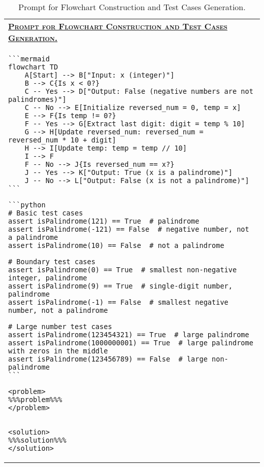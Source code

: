 \begin{table*}[htbp]
\centering
\captionsetup{justification=centering}
\begin{tabular}{p{\textwidth}}
\toprule
\underline{\textbf{\textsc{Prompt for Flowchart Construction and Test Cases Generation.}}} \\
\begin{minipage}{\textwidth}
\vspace{2mm}
\begin{verbatim}
```mermaid
flowchart TD
    A[Start] --> B["Input: x (integer)"]
    B --> C{Is x < 0?}
    C -- Yes --> D["Output: False (negative numbers are not palindromes)"]
    C -- No --> E[Initialize reversed_num = 0, temp = x]
    E --> F{Is temp != 0?}
    F -- Yes --> G[Extract last digit: digit = temp % 10]
    G --> H[Update reversed_num: reversed_num = reversed_num * 10 + digit]
    H --> I[Update temp: temp = temp // 10]
    I --> F
    F -- No --> J{Is reversed_num == x?}
    J -- Yes --> K["Output: True (x is a palindrome)"]
    J -- No --> L["Output: False (x is not a palindrome)"]
```

```python
# Basic test cases
assert isPalindrome(121) == True  # palindrome
assert isPalindrome(-121) == False  # negative number, not a palindrome
assert isPalindrome(10) == False  # not a palindrome

# Boundary test cases
assert isPalindrome(0) == True  # smallest non-negative integer, palindrome
assert isPalindrome(9) == True  # single-digit number, palindrome
assert isPalindrome(-1) == False  # smallest negative number, not a palindrome

# Large number test cases
assert isPalindrome(123454321) == True  # large palindrome
assert isPalindrome(1000000001) == True  # large palindrome with zeros in the middle
assert isPalindrome(123456789) == False  # large non-palindrome
```

<problem>
%%%problem%%%
</problem>


<solution>
%%%solution%%%
</solution>

\end{verbatim}
\end{minipage} \\
\bottomrule
\end{tabular}

\caption{Prompt for Flowchart Construction and Test Cases Generation.}
\label{tab:prompt_construction2}
\end{table*}

